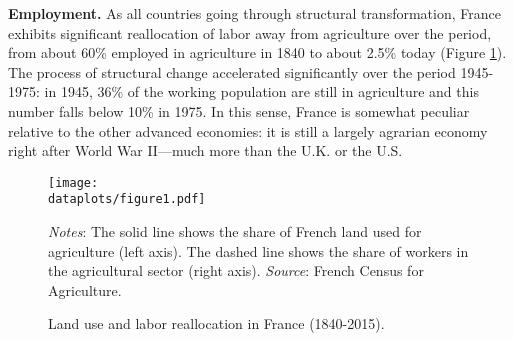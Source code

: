 \documentclass[./20250130-paper.tex]{subfiles}
\begin{document}
\textbf{Employment.} As all countries going through structural transformation, France exhibits significant reallocation of labor away from agriculture over the period, from about 60\% employed in agriculture in 1840 to about 2.5\% today (Figure \ref{fig:share_landlabor}). The process of structural change accelerated significantly over the period 1945-1975: in 1945, 36\% of the working population are still in agriculture and this number falls below 10\% in 1975. In this sense, France is somewhat peculiar relative to the other advanced economies: it is still a largely agrarian economy right after World War II---much more than the U.K. or the U.S.

\begin{figure}[h!]	
	\begin{center}
		\texttt{[image: \\dataplots/figure1.pdf]}
	\end{center}
	\vspace{-0.5cm}
	\caption{Land use and labor reallocation in France (1840-2015).\label{fig:share_landlabor}
	}
	{\footnotesize \textit{Notes}: The solid line shows the share of French land used for agriculture (left axis). The dashed line shows the share of workers in the agricultural sector (right axis).
		\textit{Source}: French Census for Agriculture.}
\end{figure}


\end{document}
